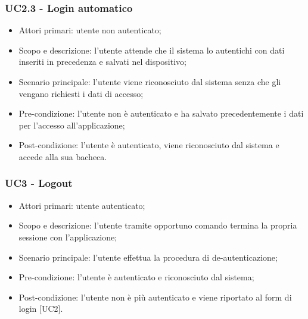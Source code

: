 \subsubsection{UC2.3 - Login automatico}
\begin{itemize}
	\item  Attori primari: utente non autenticato;
	\item  Scopo e descrizione: l'utente attende che il sistema lo autentichi con dati inseriti in precedenza e salvati nel dispositivo;
	\item  Scenario principale: l'utente viene riconosciuto dal sistema senza che gli vengano richiesti i dati di accesso;
	\item  Pre-condizione: l'utente non è autenticato e ha salvato precedentemente i dati per l'accesso all'applicazione;
	\item  Post-condizione: l'utente è autenticato, viene riconosciuto dal sistema e accede alla sua bacheca.
\end{itemize}
\subsubsection{UC3 - Logout}
\begin{itemize}
	\item  Attori primari: utente autenticato;
	\item  Scopo e descrizione: l'utente tramite opportuno comando termina la propria sessione con l'applicazione;
	\item  Scenario principale: l'utente effettua la procedura di de-autenticazione;
	\item  Pre-condizione: l'utente è autenticato e riconosciuto dal sistema;
	\item  Post-condizione: l'utente non è più autenticato e viene riportato al form di login [UC2].
\end{itemize}

